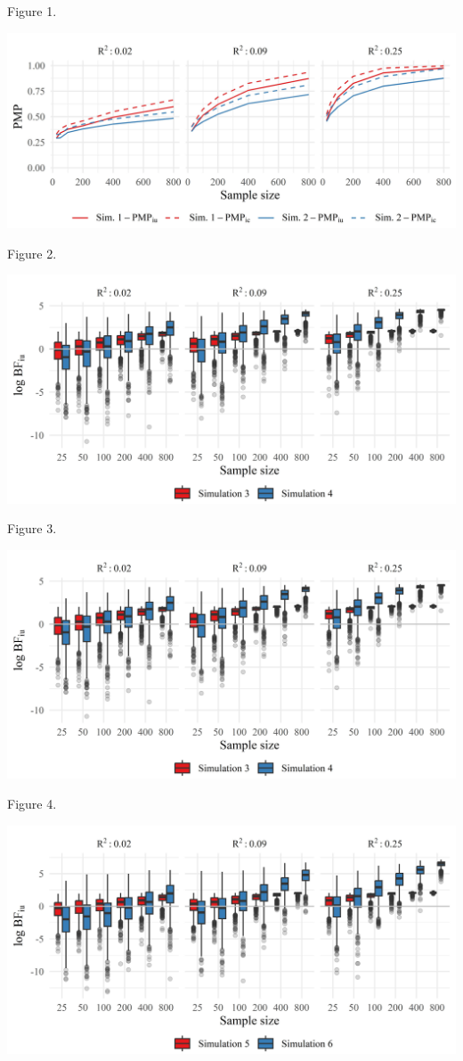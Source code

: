 \documentclass[
]{interact}
\begin{document}
Figure 1.

\includegraphics[width=1\textwidth,height=\textheight]{figures/figure-2.jpeg}

Figure 2.

\includegraphics[width=1\textwidth,height=\textheight]{figures/figure-3.jpeg}

Figure 3.

\includegraphics[width=1\textwidth,height=\textheight]{figures/figure-3.jpeg}

Figure 4.

\includegraphics[width=1\textwidth,height=\textheight]{figures/figure-5.jpeg}
\end{document}
